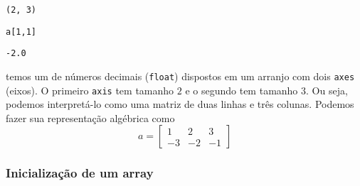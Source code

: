 \documentclass[12pt]{article}
\begin{document}
\begin{verbatim}
(2, 3)
\end{verbatim}

\begin{lstlisting}
a[1,1]
\end{lstlisting}

\begin{verbatim}
-2.0
\end{verbatim}

temos um {\PYTHONnumpyDOTarray} de números decimais (\lstinline+float+) dispostos em um arranjo com dois \lstinline+axes+ (eixos). O primeiro \lstinline+axis+ tem tamanho $2$ e o segundo tem tamanho $3$. Ou seja, podemos interpretá-lo como uma matriz de duas linhas e três colunas. Podemos fazer sua representação algébrica como
\begin{equation}
  a =
  \begin{bmatrix}
    1 & 2 & 3\\
    -3 & -2 & -1 
  \end{bmatrix}
\end{equation}

\subsubsection{Inicialização de um array}\label{subsubsection:iniarray}
\end{document}
